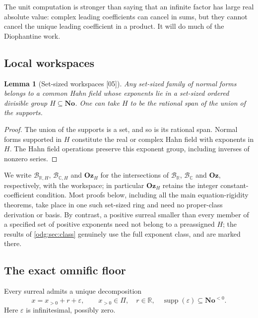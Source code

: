 \documentclass[11pt,oneside]{article}
\numberwithin{equation}{section}
\newtheorem{lemma}[lemma]{Lemma}
\theoremstyle{definition}
\theoremstyle{remark}
\newcommand{\No}{\mathbf{No}}
\newcommand{\Oz}{\mathbf{Oz}}
\newcommand{\R}{\mathbb R}
\newcommand{\C}{\mathbb C}
\newcommand{\BR}{\mathcal B_{\R}}
\newcommand{\BC}{\mathcal B_{\C}}
\newcommand{\supp}{\operatorname{supp}}
\newcommand{\src}[1]{\textup{\textsf{\small[#1]}}}
\begin{document}
The unit computation is stronger than saying that an infinite factor has
large real absolute value: complex leading coefficients can cancel in sums,
but they cannot cancel the unique leading coefficient in a product. It will
do much of the Diophantine work.

\subsection{Local workspaces}

\begin{lemma}[Set-sized workspaces \src{05}]\label{odg:lem:workspace}
Any set-sized family of normal forms belongs to a common Hahn field whose
exponents lie in a set-sized ordered divisible group $H\subseteq\No$. One can
take $H$ to be the rational span of the union of the supports.
\end{lemma}
\begin{proof}
The union of the supports is a set, and so is its rational span. Normal
forms supported in $H$ constitute the real or complex Hahn field with
exponents in $H$. The Hahn field operations preserve this exponent group,
including inverses of nonzero series.
\end{proof}

We write $\mathcal B_{\R,H}$, $\mathcal B_{\C,H}$ and $\Oz_H$ for the
intersections of $\BR$, $\BC$ and $\Oz$, respectively, with the workspace;
in particular $\Oz_H$ retains the integer constant-coefficient condition.
Most proofs below, including
all the main equation-rigidity theorems, take place in one such set-sized
ring and need no proper-class derivation or basis. By contrast, a positive
surreal smaller than every member of a specified set of positive exponents
need not belong to a preassigned $H$; the results of \cref{odg:sec:class}
genuinely use the full exponent class, and are marked there.

\subsection{The exact omnific floor}

Every surreal admits a unique decomposition
\[
 x=x_{>0}+r+\varepsilon,
 \qquad x_{>0}\in\Pi,\quad r\in\R,\quad
 \supp(\varepsilon)\subseteq\No^{<0}.
\]
Here $\varepsilon$ is infinitesimal, possibly zero.
\end{document}
